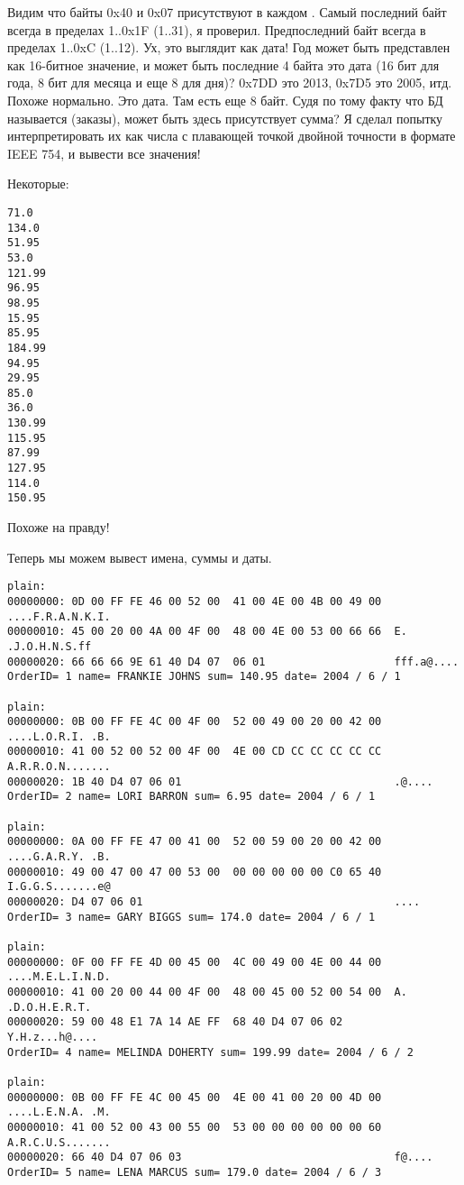 

Видим что байты 0x40 и 0x07 присутствуют в каждом .
Самый последний байт всегда в пределах 1..0x1F (1..31), я проверил.
Предпоследний байт всегда в пределах 1..0xC (1..12).
Ух, это выглядит как дата!
Год может быть представлен как 16-битное значение, и может быть последние 4 байта это дата (16 бит для года, 8 бит для
месяца и еще 8 для дня)?
0x7DD это 2013, 0x7D5 это 2005, итд. Похоже нормально. Это дата.
Там есть еще 8 байт.
Судя по тому факту что БД называется  (заказы), может быть здесь присутствует сумма?
Я сделал попытку интерпретировать их как числа с плавающей точкой двойной точности в формате IEEE 754, и вывести все значения!

Некоторые:

\begin{lstlisting}
71.0
134.0
51.95
53.0
121.99
96.95
98.95
15.95
85.95
184.99
94.95
29.95
85.0
36.0
130.99
115.95
87.99
127.95
114.0
150.95
\end{lstlisting}

Похоже на правду!

Теперь мы можем вывест имена, суммы и даты.

\begin{lstlisting}
plain:
00000000: 0D 00 FF FE 46 00 52 00  41 00 4E 00 4B 00 49 00  ....F.R.A.N.K.I.
00000010: 45 00 20 00 4A 00 4F 00  48 00 4E 00 53 00 66 66  E. .J.O.H.N.S.ff
00000020: 66 66 66 9E 61 40 D4 07  06 01                    fff.a@....
OrderID= 1 name= FRANKIE JOHNS sum= 140.95 date= 2004 / 6 / 1

plain:
00000000: 0B 00 FF FE 4C 00 4F 00  52 00 49 00 20 00 42 00  ....L.O.R.I. .B.
00000010: 41 00 52 00 52 00 4F 00  4E 00 CD CC CC CC CC CC  A.R.R.O.N.......
00000020: 1B 40 D4 07 06 01                                 .@....
OrderID= 2 name= LORI BARRON sum= 6.95 date= 2004 / 6 / 1

plain:
00000000: 0A 00 FF FE 47 00 41 00  52 00 59 00 20 00 42 00  ....G.A.R.Y. .B.
00000010: 49 00 47 00 47 00 53 00  00 00 00 00 00 C0 65 40  I.G.G.S.......e@
00000020: D4 07 06 01                                       ....
OrderID= 3 name= GARY BIGGS sum= 174.0 date= 2004 / 6 / 1

plain:
00000000: 0F 00 FF FE 4D 00 45 00  4C 00 49 00 4E 00 44 00  ....M.E.L.I.N.D.
00000010: 41 00 20 00 44 00 4F 00  48 00 45 00 52 00 54 00  A. .D.O.H.E.R.T.
00000020: 59 00 48 E1 7A 14 AE FF  68 40 D4 07 06 02        Y.H.z...h@....
OrderID= 4 name= MELINDA DOHERTY sum= 199.99 date= 2004 / 6 / 2

plain:
00000000: 0B 00 FF FE 4C 00 45 00  4E 00 41 00 20 00 4D 00  ....L.E.N.A. .M.
00000010: 41 00 52 00 43 00 55 00  53 00 00 00 00 00 00 60  A.R.C.U.S.......
00000020: 66 40 D4 07 06 03                                 f@....
OrderID= 5 name= LENA MARCUS sum= 179.0 date= 2004 / 6 / 3
\end{lstlisting}

